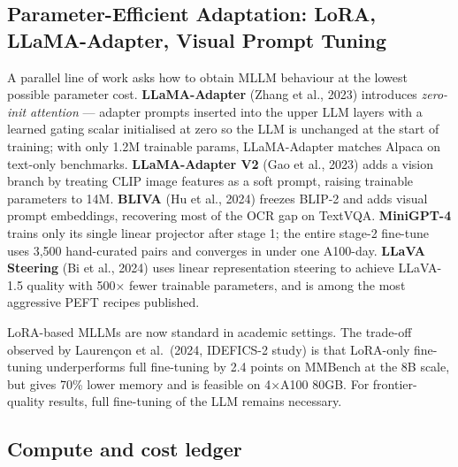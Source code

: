 \subsection{Parameter-Efficient Adaptation: LoRA, LLaMA-Adapter, Visual Prompt Tuning}\label{parameter-efficient-adaptation-lora-llama-adapter-visual-prompt-tuning}

A parallel line of work asks how to obtain MLLM behaviour at the lowest possible parameter cost. \textbf{LLaMA-Adapter} (Zhang et al., 2023) introduces \emph{zero-init attention} --- adapter prompts inserted into the upper LLM layers with a learned gating scalar initialised at zero so the LLM is unchanged at the start of training; with only 1.2M trainable params, LLaMA-Adapter matches Alpaca on text-only benchmarks. \textbf{LLaMA-Adapter V2} (Gao et al., 2023) adds a vision branch by treating CLIP image features as a soft prompt, raising trainable parameters to 14M. \textbf{BLIVA} (Hu et al., 2024) freezes BLIP-2 and adds visual prompt embeddings, recovering most of the OCR gap on TextVQA. \textbf{MiniGPT-4} trains only its single linear projector after stage 1; the entire stage-2 fine-tune uses 3,500 hand-curated pairs and converges in under one A100-day. \textbf{LLaVA Steering} (Bi et al., 2024) uses linear representation steering to achieve LLaVA-1.5 quality with 500× fewer trainable parameters, and is among the most aggressive PEFT recipes published.

LoRA-based MLLMs are now standard in academic settings. The trade-off observed by Laurençon et al.~(2024, IDEFICS-2 study) is that LoRA-only fine-tuning underperforms full fine-tuning by 2.4 points on MMBench at the 8B scale, but gives 70\% lower memory and is feasible on 4×A100 80GB. For frontier-quality results, full fine-tuning of the LLM remains necessary.

\subsection{Compute and cost ledger}\label{compute-and-cost-ledger}

